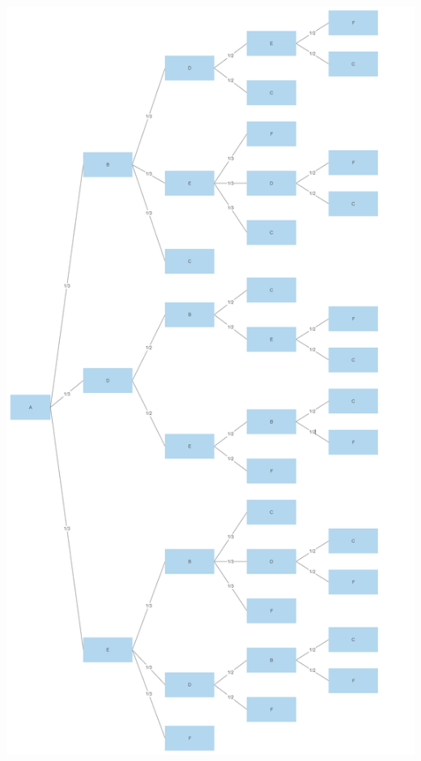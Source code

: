 \documentclass{assignment-263}
\begin{document}
\includegraphics[width=1\textwidth, inner]{Decision_Tree.jpg}
\end{document}

